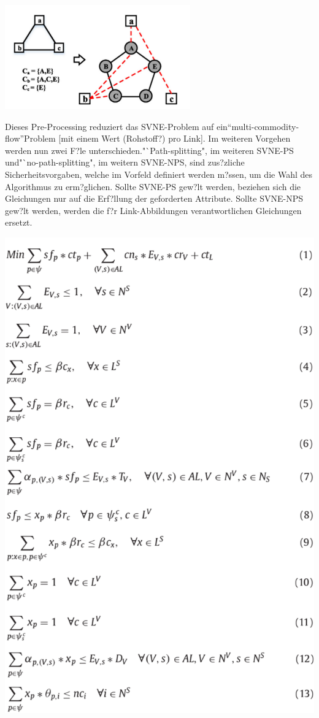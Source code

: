 \documentclass{lni}
\begin{document}
\begin{center}
	\includegraphics[width=0.6\textwidth]{aux.pdf}\newline 
\end{center}
Dieses Pre-Processing reduziert das SVNE-Problem auf ein"`multi-commodity-flow"'Problem [mit einem Wert (Rohstoff?) pro Link]. \cite{MCF}
Im weiteren Vorgehen werden nun zwei F?le unterschieden."`Path-splitting", im weiteren SVNE-PS und"`no-path-splitting", im weitern SVNE-NPS, sind zus?zliche Sicherheitsvorgaben, welche im Vorfeld definiert werden m?ssen, um die Wahl des Algorithmus zu erm?glichen. Sollte SVNE-PS gew?lt werden, beziehen sich die Gleichungen nur auf die Erf?llung der geforderten Attribute.
Sollte SVNE-NPS gew?lt werden, werden die f?r Link-Abbildungen verantwortlichen Gleichungen ersetzt.\newline
\begin{center}
	\includegraphics[width=1\textwidth]{algo.pdf}\newline
\end{center}
\end{document}
